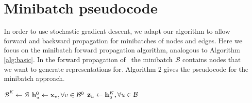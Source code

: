
\section{Minibatch pseudocode}\label{sec:minibatch}

In order to use stochastic gradient descent, we adapt our algorithm to allow forward and backward
propagation for minibatches of nodes and edges. 
Here we focus on the minibatch forward propagation
algorithm, analogous to Algorithm \ref{alg:basic}.
In the forward propagation of \name\, the minibatch $\mathcal{B}$ contains nodes that we want to generate representations for. 
Algorithm 2 gives the pseudocode for the minibatch approach. 

\setcounter{algocf}{1}
\begin{algorithm}
\caption{\name\ minibatch forward propagation algorithm}
    \BlankLine
         $\mathcal{B}^K \leftarrow \mathcal{B}$\;
        $\mathbf{h}^0_u \leftarrow \mathbf{x}_v, \forall v \in \mathcal{B}^0$ \;
     $\mathbf{z}_u\leftarrow \mathbf{h}^{K}_u, \forall u \in \mathcal{B}$ 
\end{algorithm}

